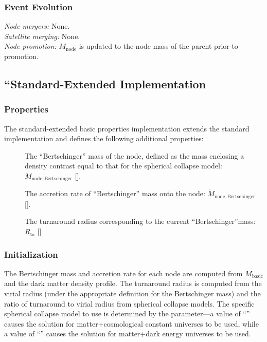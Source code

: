 \subsubsection{Event Evolution}

\noindent\emph{Node mergers:} None.\\

\noindent\emph{Satellite merging:} None.\\

\noindent\emph{Node promotion:} $M_\mathrm{node}$ is updated to the \gls{node} mass of the parent prior to promotion.\\

\subsection{``Standard-Extended Implementation}

\subsubsection{Properties}

The standard-extended basic properties implementation extends the standard implementation and defines the following additional properties:
\begin{description}
 \item [] The ``Bertschinger'' mass of the node, defined as the mass enclosing a density contrast equal to that for the spherical collapse model: $M_\mathrm{node, Bertschinger}$ [].
 \item [] The accretion rate of ``Bertschinger'' mass onto the node: $\dot{M}_\mathrm{node, Bertschinger}$ [].
 \item [] The turnaround radius corresponding to the current ``Bertschinger''mass: $R_\mathrm{ta}$ []
\end{description}

\subsubsection{Initialization}

The Bertschinger mass and accretion rate for each node are computed from $M_\mathrm{basic}$ and the dark matter density profile. The turnaround radius is computed from the virial radius (under the appropriate definition for the Bertschinger mass) and the ratio of turnaround to virial radius from spherical collapse models. The specific spherical collapse model to use is determined by the \mono{[nodeComponentBasicExtendedSphericalCollapseType]} parameter---a value of ``'' causes the solution for matter+cosmological constant universes to be used, while a value of ``'' causes the solution for matter+dark energy universes to be used.

